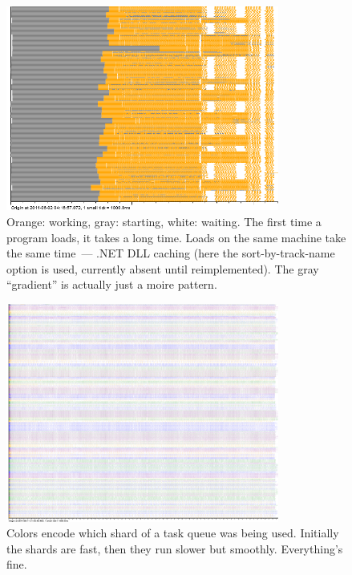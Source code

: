 \documentclass{article}
\begin{document}
\begin{figure}[p]
\center
\includegraphics[width=0.8\textwidth]{pics/splot/creepy-startup.png}
\caption{Orange: working, gray: starting, white: waiting. The first time a program loads, it takes a long time. Loads on the same machine take the same time~--- .NET DLL caching (here the sort-by-track-name option is used, currently absent until reimplemented). The gray ``gradient'' is actually just a moire pattern.}
\end{figure}

\begin{figure}[p]
\center
\includegraphics[width=0.8\textwidth]{pics/splot/4-rabbits.png}
\caption{Colors encode which shard of a task queue was being used. Initially the shards are fast, then they run slower but smoothly. Everything's fine.}
\end{figure}
\end{document}

